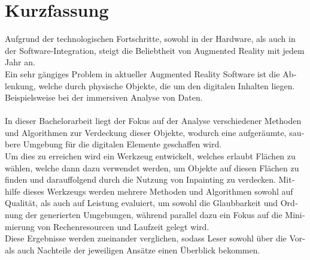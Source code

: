 \chapter{Kurzfassung}

\begin{german}
Aufgrund der technologischen Fortschritte, sowohl in der Hardware, als auch in der Software-Integration, steigt die Beliebtheit von Augmented Reality mit jedem Jahr an.
\\
Ein sehr gängiges Problem in aktueller Augmented Reality Software ist die Ablenkung, welche durch physische Objekte, die um den digitalen Inhalten liegen. Beispielsweise bei der immersiven Analyse von Daten.
\\\\
In dieser Bachelorarbeit liegt der Fokus auf der Analyse verschiedener Methoden und Algorithmen zur Verdeckung dieser Objekte, wodurch eine aufgeräumte, saubere Umgebung für die digitalen Elemente geschaffen wird.
\\
Um dies zu erreichen wird ein Werkzeug entwickelt, welches erlaubt Flächen zu wählen, welche dann dazu verwendet werden, um Objekte auf diesen Flächen zu finden und darauffolgend durch die Nutzung von Inpainting zu verdecken. Mithilfe dieses Werkzeugs werden mehrere Methoden und Algorithmen sowohl auf Qualität, als auch auf Leistung evaluiert, um sowohl die Glaubbarkeit und Ordnung der generierten Umgebungen, während parallel dazu ein Fokus auf die Minimierung von Rechenresourcen und Laufzeit gelegt wird.
\\
Diese Ergebnisse werden zueinander verglichen, sodass Leser sowohl über die Vor- als auch Nachteile der jeweiligen Ansätze einen Überblick bekommen.
\end{german}